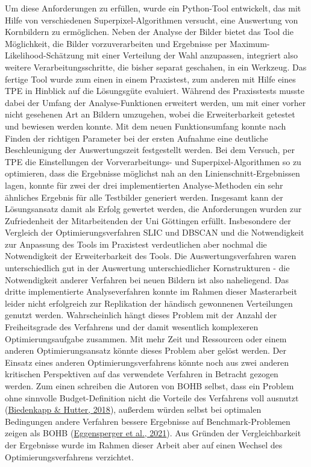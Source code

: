 \documentclass[
  12pt,
  openany]{book}
\begin{document}
Um diese Anforderungen zu erfüllen, wurde ein Python-Tool entwickelt, das mit Hilfe von verschiedenen Superpixel-Algorithmen versucht, eine Auswertung von Kornbildern zu ermöglichen. Neben der Analyse der Bilder bietet das Tool die Möglichkeit, die Bilder vorzuverarbeiten und Ergebnisse per Maximum-Likelihood-Schätzung mit einer Verteilung der Wahl anzupassen, integriert also weitere Verarbeitungsschritte, die bisher separat geschahen, in ein Werkzeug. Das fertige Tool wurde zum einen in einem Praxistest, zum anderen mit Hilfe eines TPE in Hinblick auf die Lösungsgüte evaluiert. Während des Praxisstests musste dabei der Umfang der Analyse-Funktionen erweitert werden, um mit einer vorher nicht gesehenen Art an Bildern umzugehen, wobei die Erweiterbarkeit getestet und bewiesen werden konnte.
Mit dem neuen Funktionsumfang konnte nach Finden der richtigen Parameter bei der ersten Aufnahme eine deutliche Beschleunigung der Auswertungszeit festgestellt werden. Bei dem Versuch, per TPE die Einstellungen der Vorverarbeitungs- und Superpixel-Algorithmen so zu optimieren, dass die Ergebnisse möglichst nah an den Linienschnitt-Ergebnissen lagen, konnte für zwei der drei implementierten Analyse-Methoden ein sehr ähnliches Ergebnis für alle Testbilder generiert werden.
Insgesamt kann der Lösungsansatz damit als Erfolg gewertet werden, die Anforderungen wurden zur Zufriedenheit der Mitarbeitenden der Uni Göttingen erfüllt. Insbesondere der Vergleich der Optimierungsverfahren SLIC und DBSCAN und die Notwendigkeit zur Anpassung des Tools im Praxistest verdeutlichen aber nochmal die Notwendigkeit der Erweiterbarkeit des Tools. Die Auswertungsverfahren waren unterschiedlich gut in der Auswertung unterschiedlicher Kornstrukturen - die Notwendigkeit anderer Verfahren bei neuen Bildern ist also naheliegend.
Das dritte implementierte Analyseverfahren konnte im Rahmen dieser Masterarbeit leider nicht erfolgreich zur Replikation der händisch gewonnenen Verteilungen genutzt werden. Wahrscheinlich hängt dieses Problem mit der Anzahl der Freiheitsgrade des Verfahrens und der damit wesentlich komplexeren Optimierungsaufgabe zusammen. Mit mehr Zeit und Ressourcen oder einem anderen Optimierungsansatz könnte dieses Problem aber gelöst werden.
Der Einsatz eines anderen Optimierungsverfahrens könnte noch aus zwei anderen kritischen Perspektiven auf das verwendete Verfahren in Betracht gezogen werden. Zum einen schreiben die Autoren von BOHB selbst, dass ein Problem ohne sinnvolle Budget-Definition nicht die Vorteile des Verfahrens voll ausnutzt (\protect\hyperlink{ref-biedenkappAutoMLBOHBRobust2018}{Biedenkapp \& Hutter, 2018}), außerdem würden selbst bei optimalen Bedingungen andere Verfahren bessere Ergebnisse auf Benchmark-Problemen zeigen als BOHB (\protect\hyperlink{ref-eggenspergerHPOBenchCollectionReproducible2021}{Eggensperger et al., 2021}). Aus Gründen der Vergleichbarkeit der Ergebnisse wurde im Rahmen dieser Arbeit aber auf einen Wechsel des Optimierungsverfahrens verzichtet.
\end{document}
